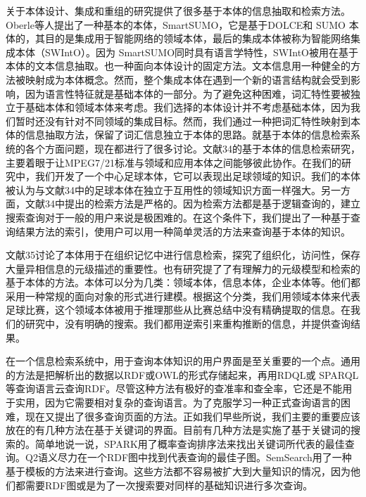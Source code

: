 关于本体设计、集成和重组的研究提供了很多基于本体的信息抽取和检索方法。{\Times Oberle}等人提出了一种基本的本体，{\Times SmartSUMO}，它是基于{\Times DOLCE}和 {\Times SUMO} 本体的，其目的是集成用于智能网络的领域本体，最后的集成本体被称为智能网络集成本体（{\Times SWIntO}）。因为 {\Times SmartSUMO}同时具有语言学特性，{\Times SWIntO}被用在基于本体的文本信息抽取。也一种面向本体设计的固定方法。文本信息用一种健全的方法被映射成为本体概念。然而，整个集成本体在遇到一个新的语言结构就会受到影响，因为语言性特征就是基础本体的一部分。为了避免这种困难，词汇特性要被独立于基础本体和领域本体来考虑。我们选择的本体设计并不考虑基础本体，因为我们暂时还没有针对不同领域的集成目标。然而，我们通过一种把词汇特性映射到本体的信息抽取方法，保留了词汇信息独立于本体的思路。就基于本体的信息检索系统的各个方面问题，现在都进行了很多讨论。文献34的基于本体的信息检索研究，主要着眼于让{\Times MPEG7/21}标准与领域和应用本体之间能够彼此协作。在我们的研究中，我们开发了一个中心足球本体，它可以表现出足球领域的知识。我们的本体被认为与文献34中的足球本体在独立于互用性的领域知识方面一样强大。另一方面，文献34中提出的检索方法是严格的。因为检索方法都是基于逻辑查询的，建立搜索查询对于一般的用户来说是极困难的。在这个条件下，我们提出了一种基于查询结果方法的索引，使用户可以用一种简单灵活的方法来查询基于本体的知识。

文献35讨论了本体用于在组织记忆中进行信息检索，探究了组织化，访问性，保存大量异相信息的元级描述的重要性。也有研究提了了有理解力的元级模型和检索的基于本体的方法。本体可以分为几类：领域本体，信息本体，企业本体等。他们都采用一种常规的面向对象的形式进行建模。根据这个分类，我们用领域本体来代表足球比赛，这个领域本体被用于推理那些从比赛总结中没有精确提取的信息。在我们的研究中，没有明确的搜索。我们都用逆索引来重构推断的信息，并提供查询结果。

在一个信息检索系统中，用于查询本体知识的用户界面是至关重要的一个点。通用的方法是把解析出的数据以{\Times RDF}或{\Times OWL}的形式存储起来，再用{\Times RDQL}或 {\Times SPARQL}等查询语言云查询{\Times RDF}。尽管这种方法有极好的查准率和查全率，它还是不能用于实用，因为它需要相对复杂的查询语言。为了克服学习一种正式查询语言的困难，现在又提出了很多查询页面的方法。正如我们早些所说，我们主要的重要应该放在的有几种方法在基于关键词的界面。目前有几种方法是实施了基于关键词的搜索的。简单地说一说，{\Times SPARK}用了概率查询排序法来找出关键词所代表的最佳查询。{\Times Q2}语义尽力在一个{\Times RDF}图中找到代表查询的最佳子图。{\Times SemSearch}用了一种基于模板的方法来进行查询。这些方法都不容易被扩大到大量知识的情况，因为他们都需要{\Times RDF}图或是为了一次搜索要对同样的基础知识进行多次查询。


